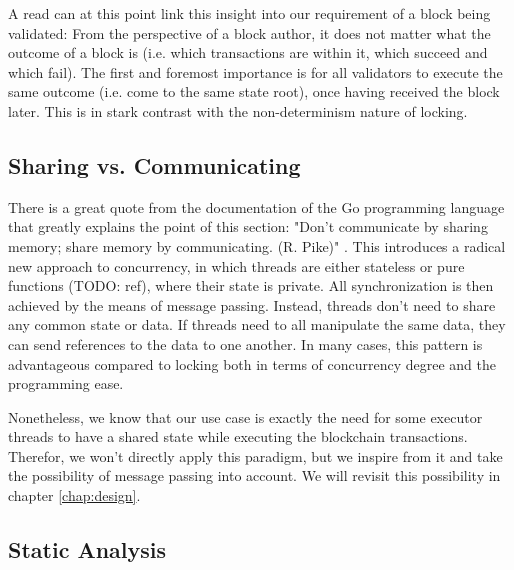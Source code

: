 \begin{remark}
	A read can at this point link this insight into our requirement of a block being validated: From
	the perspective of a block author, it does not matter what the outcome of a block is (i.e. which
	transactions are within it, which succeed and which fail). The first and foremost importance is
	for all validators to execute the same outcome (i.e. come to the same state root), once having
	received the block later. This is in stark contrast with the non-determinism nature of locking.
\end{remark}


\subsection{Sharing vs. Communicating}\label{chap_bg:subsec:sharing_communication}

There is a great quote from the documentation of the Go programming language that greatly explains
the point of this section: "Don't communicate by sharing memory; share memory by communicating. (R.
Pike)" \cite{ShareMemoryCommunicating}. This introduces a radical new approach to concurrency, in
which threads are either stateless or pure functions (TODO: ref), where their state is private. All
synchronization is then achieved by the means of message passing. Instead, threads don't need to
share any common state or data. If threads need to all manipulate the same data, they can send
references to the data to one another. In many cases, this pattern is advantageous compared to
locking both in terms of concurrency degree and the programming ease.

Nonetheless, we know that our use case is exactly the need for some executor threads to have a
shared state while executing the blockchain transactions. Therefor, we won't directly apply this
paradigm, but we inspire from it and take the possibility of message passing into account. We will
revisit this possibility in chapter \ref{chap:design}.

\subsection{Static Analysis}

